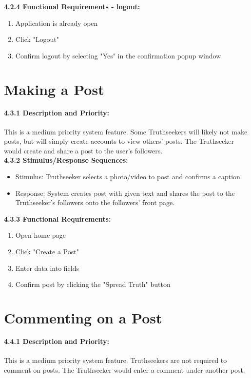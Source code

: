     \quad \textbf{4.2.4 \quad Functional Requirements - logout:}
    \begin{enumerate}
        \item Application is already open
        \item Click "Logout"
        \item Confirm logout by selecting "Yes" in the confirmation popup window
    \end{enumerate}

\section{Making a Post}
    \quad \textbf{4.3.1 \quad Description and Priority:}\\ \\
    \null \quad This is a medium priority system feature. Some Truthseekers will likely not make posts, but will simply create accounts to view others' posts. The Truthseeker would create and share a post to the user's followers. \\
    
    \quad \textbf{4.3.2 \quad Stimulus/Response Sequences:}
    \begin{itemize}
    \item[] Stimulus: \thinspace \quad Truthseeker selects a photo/video to post and confirms a caption.
    \item[] Response: \quad System creates post with given text and shares the post to the Truthseeker's followers onto the followers' front page.
    \end{itemize}
    
    \quad \textbf{4.3.3 \quad Functional Requirements:}
    \begin{enumerate}
        \item Open home page
        \item Click "Create a Post"
        \item Enter data into fields
        \item Confirm post by clicking the "Spread Truth" button
    \end{enumerate}

\section{Commenting on a Post}
    \quad \textbf{4.4.1 \quad Description and Priority:}\\ \\
    \null \quad This is a medium priority system feature. Truthseekers are not required to comment on posts. The Truthseeker would enter a comment under another post. \\
    
